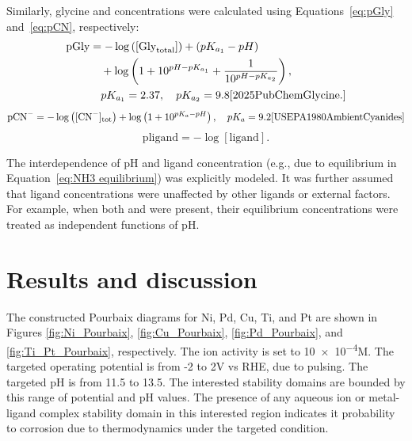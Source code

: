 \documentclass[journal=jacsat,manuscript=article]{achemso}
\begin{document}
Similarly, glycine and  concentrations were calculated using Equations~\eqref{eq:pGly} and~\eqref{eq:pCN}, respectively:
\begin{align} \label{eq:pGly}
\text{pGly} &= -\log \left([\text{Gly}_{\text{total}}]\right) + (pK_{a_1} - pH) \nonumber \\
&\quad + \log \left(1 + 10^{pH - pK_{a_1}} + \frac{1}{10^{pH - pK_{a_2}}} \right), \nonumber \\
&\quad pK_{a_1} = 2.37, \quad pK_{a_2} = 9.8 \cite{2025PubChemGlycine.}
\end{align}
\begin{equation} \label{eq:pCN}
\text{pCN}^- = -\log \left([\text{CN}^-]_{\text{tot}}\right) + \log \left(1 + 10^{pK_a - pH} \right), \quad pK_a = 9.2 \cite{USEPA1980AmbientCyanides}
\end{equation}
\begin{equation} \label{eq:pligand}
\text{pligand} = -\log[\text{ligand}].
\end{equation}

The interdependence of pH and ligand concentration (e.g., due to  equilibrium in Equation~\eqref{eq:NH3 equilibrium}) was explicitly modeled. It was further assumed that ligand concentrations were unaffected by other ligands or external factors. For example, when both  and  were present, their equilibrium concentrations were treated as independent functions of pH.



\section{Results and discussion}
The constructed Pourbaix diagrams for Ni, Pd, Cu, Ti, and Pt are shown in Figures \ref{fig:Ni_Pourbaix}, \ref{fig:Cu_Pourbaix}, \ref{fig:Pd_Pourbaix}, and \ref{fig:Ti_Pt_Pourbaix}, respectively. The ion activity is set to \num{10e-4}M. The targeted operating potential is from -2 to 2V vs RHE, due to pulsing. The targeted pH is from 11.5 to 13.5. The interested stability domains are bounded by  this range of potential and pH values. The presence of any aqueous ion or metal-ligand complex stability domain in this interested region indicates it probability to corrosion due to thermodynamics under the targeted condition. 
\end{document}
